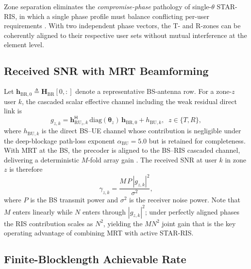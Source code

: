 \documentclass[journal]{IEEEtran}
\newcommand{\vect}[1]{\bm{#1}}
\newcommand{\mat}[1]{\mathbf{#1}}
\begin{document}
Zone separation eliminates the \emph{compromise-phase} pathology of
single-$\theta$ STAR-RIS, in which a single phase profile must
balance conflicting per-user requirements \cite{mu2022star}. With
two independent phase vectors, the T- and R-zones can be coherently
aligned to their respective user sets without mutual interference at
the element level.

\subsection{Received SNR with MRT Beamforming}
\label{sec:snr}

Let $\vect{h}_{\mathrm{BR},0}\!\triangleq\!\mat{H}_{\mathrm{BR}}[0,:]$
denote a representative BS-antenna row. For a zone-$z$ user $k$, the
cascaded scalar effective channel including the weak residual direct
link is
\begin{equation}
  g_{z,k}=\vect{h}_{\mathrm{RU}_z,k}^{\mathsf{H}}\,
          \mathrm{diag}(\vect{\theta}_z)\,\vect{h}_{\mathrm{BR},0}+
          h_{\mathrm{BU},k},\;\;z\!\in\!\{T,R\},
  \label{eq:geff}
\end{equation}
where $h_{\mathrm{BU},k}$ is the direct BS--UE channel whose
contribution is negligible under the deep-blockage path-loss exponent
$\alpha_{\mathrm{BU}}\!=\!5.0$ but is retained for completeness.
With MRT at the BS, the precoder is aligned to the BS--RIS cascaded
channel, delivering a deterministic $M$-fold array gain
\cite{lo1999maximum}. The received SNR at user $k$ in zone $z$ is
therefore
\begin{equation}
  \gamma_{z,k}=\frac{M\,P\,|g_{z,k}|^2}{\sigma^2},
  \label{eq:snr}
\end{equation}
where $P$ is the BS transmit power and $\sigma^2$ is the receiver
noise power. Note that $M$ enters linearly while $N$ enters through
$|g_{z,k}|^2$; under perfectly aligned phases the RIS contribution
scales as $N^2$, yielding the $MN^2$ joint gain that is the key
operating advantage of combining MRT with active STAR-RIS.

\subsection{Finite-Blocklength Achievable Rate}
\label{sec:fbl}
\end{document}
